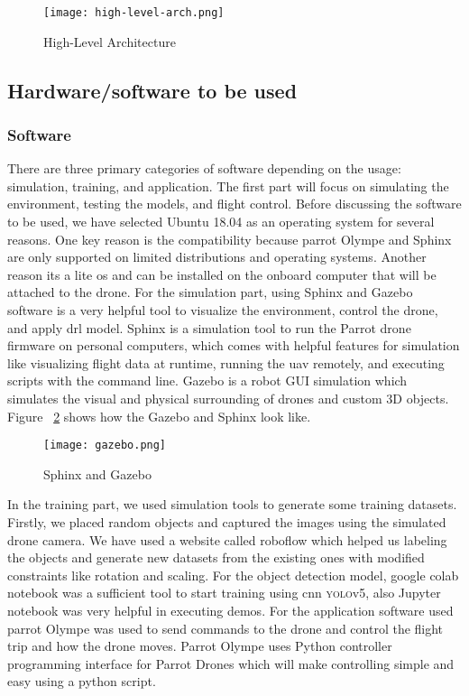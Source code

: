 \documentclass[../main.tex]{subfiles}
\begin{document}
\begin{figure}[H]
	\centering
	\texttt{[image: high-level-arch.png]}
	\caption{High-Level Architecture}\label{fig1:arch-fig}
\end{figure}


\subsection{Hardware/software to be used}

\subsubsection{Software}
There are three primary categories of software depending on the usage: simulation, training, and application. The first part will focus on simulating the environment, testing the models, and flight control. Before discussing the software to be used, we have selected Ubuntu 18.04 as an operating system for several reasons. One key reason is the compatibility because parrot Olympe and Sphinx are only supported on limited distributions and operating systems. Another reason its a lite os and can be installed on the onboard computer that will be attached to the drone. For the simulation part, using Sphinx and Gazebo software is a very helpful tool to visualize the environment, control the drone, and apply \gls{drl} model. Sphinx is a simulation tool to run the Parrot drone firmware on personal computers, which comes with helpful features for simulation like visualizing flight data at runtime, running the \gls{uav} remotely, and executing scripts with the command line. Gazebo is a robot GUI simulation which simulates the visual and physical surrounding of drones and custom 3D objects. Figure ~\ref{fig2:gazebo} shows how the Gazebo and Sphinx look like. \begin{figure}[H]
	\centering
	\texttt{[image: gazebo.png]}
	\caption{Sphinx and Gazebo }\label{fig2:gazebo}
\end{figure}
In the training part, we used simulation tools to generate some training datasets. Firstly, we placed random objects and captured the images using the simulated drone camera. We have used a website called roboflow which helped us labeling the objects and generate new datasets from the existing ones with modified constraints like rotation and scaling. For the object detection model, google colab notebook was a sufficient tool to start training using \gls{cnn} \textsc{yolo}v5, also Jupyter notebook was very helpful in executing demos. For the application software used parrot Olympe was used to send commands to the drone and control the flight trip and how the drone moves. Parrot Olympe uses Python controller programming interface for Parrot Drones which will make controlling simple and easy using a python script.
\end{document}
